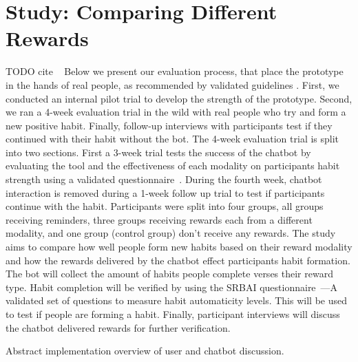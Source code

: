 \section{Study: Comparing Different Rewards}
TODO cite ~\cite{how_to_evaluate_tech_for_behaviour_change}\newline
Below we present our evaluation process, that place the prototype in the hands of real people, as recommended by validated guidelines \cite{article_mhealth}. First, we conducted an internal pilot trial to develop the strength of the prototype. Second, we ran a 4-week evaluation trial in the wild with real people who try and form a new positive habit. Finally, follow-up interviews with participants test if they continued with their habit without the bot.\newline
\newline
The 4-week evaluation trial is split into two sections. First a 3-week trial tests the success of the chatbot by evaluating the tool and the effectiveness of each modality on participants habit strength using a validated questionnaire~\cite{article_4q_SRBAI}. During the fourth week, chatbot interaction is removed during a 1-week follow up trial to test if participants continue with the habit. Participants were split into four groups, all groups receiving reminders, three groups receiving rewards each from a different modality, and one group (control group) don't receive any rewards.\newline
\newline
The study aims to compare how well people form new habits based on their reward modality and how the rewards delivered by the chatbot effect participants habit formation. The bot will collect the amount of habits people complete verses their reward type. Habit completion will be verified by using the SRBAI questionnaire~\cite{article_4q_SRBAI}---A validated set of questions to measure habit automaticity levels. This will be used to test if people are forming a habit. Finally, participant interviews will discuss the chatbot delivered rewards for further verification.


Abstract implementation overview of user and chatbot discussion.

